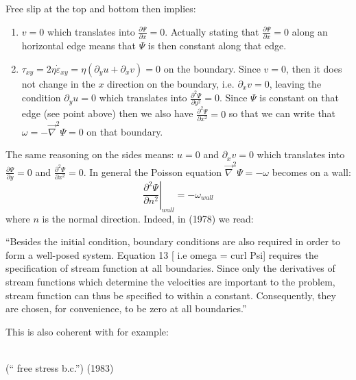 Free slip at the top and bottom then implies: 
\begin{enumerate}
\item $v=0$ which translates into $\frac{\partial \Psi}{\partial x}=0$.
Actually stating that $\frac{\partial \Psi}{\partial x}=0$ along an horizontal 
edge means that $\Psi$ is then constant along that edge.

\item $\tau_{xy}=2 \eta \dot{\varepsilon}_{xy} =  \eta (\partial_y u + \partial_x v) =0$ on the boundary.
Since $v=0$, then it does not change in the $x$ direction on the boundary, i.e. $\partial_x v=0$, 
leaving the condition $\partial_y u = 0$ which translates into $\frac{\partial^2 \Psi}{\partial y^2}=0$. 
Since $\Psi$ is constant on that edge (see point above) then we also have $\frac{\partial^2 \Psi}{\partial x^2}=0$ so that we can write that $\omega=-\vec\nabla^2 \Psi=0$ on that boundary.
\end{enumerate}

The same reasoning on the sides means: $u=0$ and $\partial_x v = 0$ which 
translates into $\frac{\partial \Psi}{\partial y}=0$ and $\frac{\partial^2 \Psi}{\partial x^2}=0$.
In general the Poisson equation $\vec\nabla^2 \Psi = -\omega$ becomes on a wall: 
\[
\left. \frac{\partial^2 \Psi}{\partial n^2}\right\rvert_{wall}=-\omega_{wall}
\]
where $n$ is the normal direction.
Indeed, in \textcite{hsui78} (1978) we read:
\begin{displayquote}
{\color{darkgray}
``Besides the initial condition,
boundary conditions are also required in order to form a well-posed system. 
Equation 13 [ i.e omega = curl Psi] requires the specification of
stream function at all boundaries. Since only the derivatives of stream functions 
which determine the velocities are important to the problem, stream
function can thus be specified to within a constant. Consequently,
they are chosen, for convenience, to be zero at all boundaries.''
}
\end{displayquote}

\noindent This is also coherent with for example: 
\begin{center}
 \hspace{0.5cm} 
\\
(`` free stress b.c.'') \textcite{rimc81} \hspace{3cm} \textcite{mato83} (1983)
\end{center}

